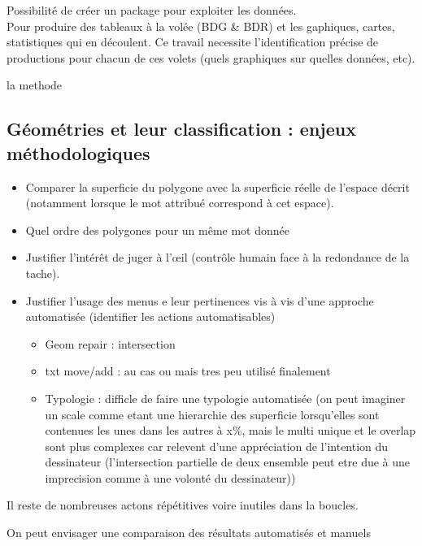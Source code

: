 \documentclass[
  12pt,
  a4paperpaper,
]{book}
\providecommand{\tightlist}{%
  \setlength{\itemsep}{0pt}\setlength{\parskip}{0pt}}\usepackage{longtable,booktabs,array}
\begin{document}
Possibilité de créer un package pour exploiter les données.\\
Pour produire des tableaux à la volée (BDG \& BDR) et les gaphiques,
cartes, statistiques qui en découlent. Ce travail necessite
l'identification précise de productions pour chacun de ces volets (quels
graphiques sur quelles données, etc).

la methode

\hypertarget{guxe9omuxe9tries-et-leur-classification-enjeux-muxe9thodologiques}{%
\subsection{Géométries et leur classification : enjeux
méthodologiques}\label{guxe9omuxe9tries-et-leur-classification-enjeux-muxe9thodologiques}}

\begin{itemize}
\tightlist
\item
  Comparer la superficie du polygone avec la superficie réelle de
  l'espace décrit (notamment lorsque le mot attribué correspond à cet
  espace).
\item
  Quel ordre des polygones pour un même mot donnée
\item
  Justifier l'intérêt de juger à l'œil (contrôle humain face à la
  redondance de la tache).
\item
  Justifier l'usage des menus e leur pertinences vis à vis d'une
  approche automatisée (identifier les actions automatisables)

  \begin{itemize}
  \tightlist
  \item
    Geom repair : intersection
  \item
    txt move/add : au cas ou mais tres peu utilisé finalement
  \item
    Typologie : difficle de faire une typologie automatisée (on peut
    imaginer un scale comme etant une hierarchie des superficie
    lorsqu'elles sont contenues les unes dans les autres à x\%, mais le
    multi unique et le overlap sont plus complexes car relevent d'une
    appréciation de l'intention du dessinateur (l'intersection partielle
    de deux ensemble peut etre due à une imprecision comme à une volonté
    du dessinateur))
  \end{itemize}
\end{itemize}

Il reste de nombreuses actons répétitives voire inutiles dans la
boucles.

On peut envisager une comparaison des résultats automatisés et manuels
\end{document}
